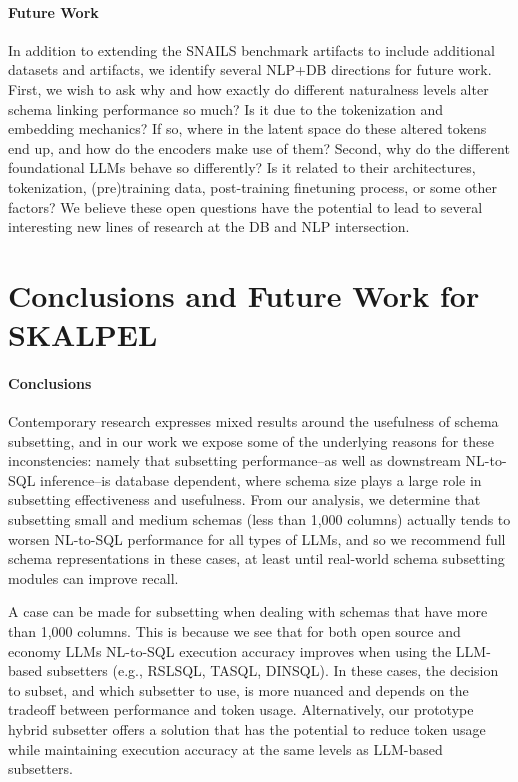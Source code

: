 \paragraph{\textbf{Future Work}}
In addition to extending the SNAILS  benchmark artifacts to include additional datasets and artifacts, we identify several NLP+DB directions for future work.
First, we wish to ask why and how exactly do different naturalness levels alter schema linking performance so much?
Is it due to the tokenization and embedding mechanics?
If so, where in the latent space do these altered tokens end up, and how do the encoders make use of them?
Second, why do the different foundational LLMs behave so differently?
Is it related to their architectures, tokenization, (pre)training data, post-training finetuning process, or some other factors?
We believe these open questions have the potential to lead to several interesting new lines of research at the DB and NLP intersection.

\section{Conclusions and Future Work for SKALPEL}
\paragraph{\textbf{Conclusions}}
Contemporary research expresses mixed results around the usefulness of schema subsetting, and in our work we expose some of the underlying reasons for these inconstencies: namely that subsetting performance--as well as downstream NL-to-SQL inference--is database dependent, where schema size plays a large role in subsetting effectiveness and usefulness.
From our analysis, we determine that subsetting small and medium schemas (less than 1,000 columns) actually tends to worsen NL-to-SQL performance for all types of LLMs, and so we recommend full schema representations in these cases, at least until real-world schema subsetting modules can improve recall.

A case can be made for subsetting when dealing with schemas that have more than 1,000 columns. 
This is because we see that for both open source and economy LLMs NL-to-SQL execution accuracy improves when using the LLM-based subsetters (e.g., RSLSQL, TASQL, DINSQL).
In these cases, the decision to subset, and which subsetter to use, is more nuanced and depends on the tradeoff between performance and token usage.
Alternatively, our prototype \PROJECTNAME{ }hybrid subsetter offers a solution that has the potential to reduce token usage while maintaining execution accuracy at the same levels as LLM-based subsetters.
